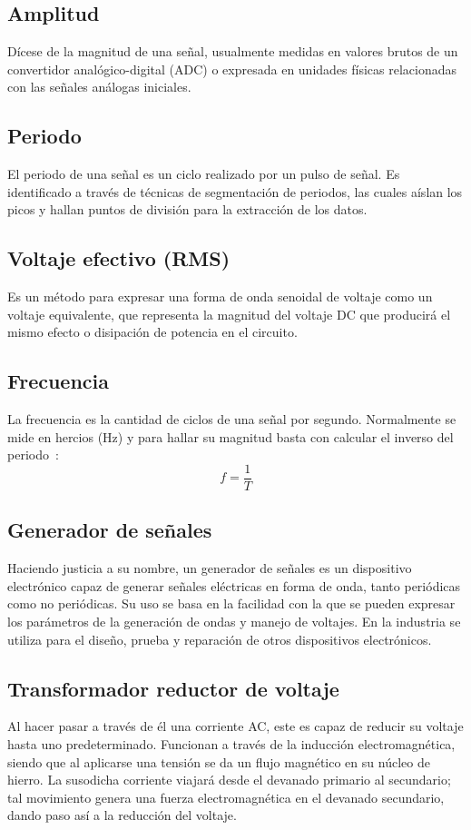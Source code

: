 \documentclass[conference]{IEEEtran} %
\begin{document}
\subsection{Amplitud}
Dícese de la magnitud de una señal, usualmente medidas en valores brutos de un convertidor analógico-digital (ADC) o expresada en unidades físicas relacionadas con las señales análogas iniciales.~\cite{signalAmplitude}

\subsection{Periodo}
El periodo de una señal es un ciclo realizado por un pulso de señal. Es identificado a través de técnicas de segmentación de periodos, las cuales aíslan los picos y hallan puntos de división para la extracción de los datos.~\cite{periodicSignal}

\subsection{Voltaje efectivo (RMS)}
Es un método para expresar una forma de onda senoidal de voltaje como un voltaje equivalente, que representa la magnitud del voltaje DC que producirá el mismo efecto o disipación de potencia en el circuito.~\cite{voltajeRMS}

\subsection{Frecuencia}
La frecuencia es la cantidad de ciclos de una señal por segundo. Normalmente se mide en hercios (Hz) y para hallar su magnitud basta con calcular el inverso del periodo~\cite{hertz}:
\begin{equation}
    f = \frac{1}{T}
\end{equation}

\subsection{Generador de señales}
Haciendo justicia a su nombre, un generador de señales es un dispositivo electrónico capaz de generar señales eléctricas en forma de onda, tanto periódicas como no periódicas. Su uso se basa en la facilidad con la que se pueden expresar los parámetros de la generación de ondas y manejo de voltajes. En la industria se utiliza para el diseño, prueba y reparación de otros dispositivos electrónicos.~\cite{distronGenerador}

\subsection{Transformador reductor de voltaje}
Al hacer pasar a través de él una corriente AC, este es capaz de reducir su voltaje hasta uno predeterminado. Funcionan a través de la inducción electromagnética, siendo que al aplicarse una tensión se da un flujo magnético en su núcleo de hierro. La susodicha corriente viajará desde el devanado primario al secundario; tal movimiento genera una fuerza electromagnética en el devanado secundario, dando paso así a la reducción del voltaje.~\cite{transformadorEndesa}
\end{document}
